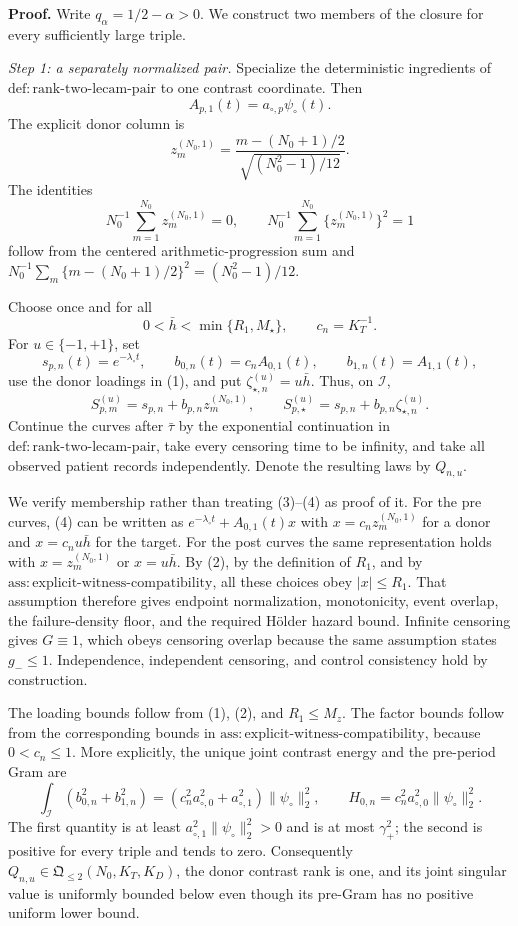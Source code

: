 \textbf{Proof.}
Write \(q_\alpha=1/2-\alpha>0\).  We construct two members of the closure for
every sufficiently large triple.

\emph{Step 1: a separately normalized pair.}
Specialize the deterministic ingredients of
\(\mathrm{def:rank\mbox{-}two\mbox{-}lecam\mbox{-}pair}\) to one contrast
coordinate.  Then
\[
A_{p,1}(t)=a_{\circ,p}\psi_\circ(t).
\]
The explicit donor column is
\[
z_m^{(N_0,1)}
=\frac{m-(N_0+1)/2}{\sqrt{(N_0^2-1)/12}}.
\]
The identities
\[
N_0^{-1}\sum_{m=1}^{N_0}z_m^{(N_0,1)}=0,
\qquad
N_0^{-1}\sum_{m=1}^{N_0}\{z_m^{(N_0,1)}\}^2=1
\tag{1}
\]
follow from the centered arithmetic-progression sum and
\(N_0^{-1}\sum_m\{m-(N_0+1)/2\}^2=(N_0^2-1)/12\).

Choose once and for all
\[
0<\bar h<\min\{R_1,M_\star\},
\qquad c_n=K_T^{-1}.
\tag{2}
\]
For \(u\in\{-1,+1\}\), set
\[
s_{p,n}(t)=e^{-\lambda_\circ t},
\qquad b_{0,n}(t)=c_nA_{0,1}(t),
\qquad b_{1,n}(t)=A_{1,1}(t),
\tag{3}
\]
use the donor loadings in (1), and put \(\zeta_{\star,n}^{(u)}=u\bar h\).
Thus, on \(\mathcal I\),
\[
S_{p,m}^{(u)}=s_{p,n}+b_{p,n}z_m^{(N_0,1)},
\qquad
S_{p,\star}^{(u)}=s_{p,n}+b_{p,n}\zeta_{\star,n}^{(u)}.
\tag{4}
\]
Continue the curves after \(\bar\tau\) by the exponential continuation in
\(\mathrm{def:rank\mbox{-}two\mbox{-}lecam\mbox{-}pair}\), take every censoring
time to be infinity, and take all observed patient records independently.  Denote
the resulting laws by \(Q_{n,u}\).

We verify membership rather than treating (3)--(4) as proof of it.  For the pre
curves, (4) can be written as
\(e^{-\lambda_\circ t}+A_{0,1}(t)x\) with
\(x=c_nz_m^{(N_0,1)}\) for a donor and
\(x=c_nu\bar h\) for the target.  For the post curves the same representation
holds with \(x=z_m^{(N_0,1)}\) or \(x=u\bar h\).  By (2), by the definition of
\(R_1\), and by
\(\mathrm{ass:explicit\mbox{-}witness\mbox{-}compatibility}\), all these
choices obey \(|x|\leq R_1\).  That assumption therefore gives endpoint
normalization, monotonicity, event overlap, the failure-density floor, and the
required Hölder hazard bound.  Infinite censoring gives \(G\equiv1\), which obeys
censoring overlap because the same assumption states \(g_-\leq1\).  Independence,
independent censoring, and control consistency hold by construction.

The loading bounds follow from (1), (2), and \(R_1\leq M_z\).  The factor bounds
follow from the corresponding bounds in
\(\mathrm{ass:explicit\mbox{-}witness\mbox{-}compatibility}\), because
\(0<c_n\leq1\).  More explicitly, the unique joint contrast energy and the
pre-period Gram are
\[
\int_{\mathcal I}(b_{0,n}^2+b_{1,n}^2)
=(c_n^2a_{\circ,0}^2+a_{\circ,1}^2)\|\psi_\circ\|_2^2,
\qquad
H_{0,n}=c_n^2a_{\circ,0}^2\|\psi_\circ\|_2^2.
\tag{5}
\]
The first quantity is at least
\(a_{\circ,1}^2\|\psi_\circ\|_2^2>0\) and is at most \(\gamma_+^2\); the
second is positive for every triple and tends to zero.  Consequently
\(Q_{n,u}\in\mathfrak Q_{\leq2}(N_0,K_T,K_D)\), the donor contrast rank is one,
and its joint singular value is uniformly bounded below even though its pre-Gram
has no positive uniform lower bound.

